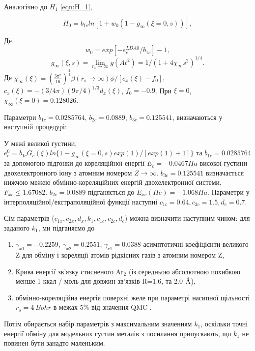 Аналогічно до $H_1$ \ref{eqn:H_1}, 

\begin{equation}
	H_0 = b_{1c}ln[1+w_0(1 - g_\infty(\xi = 0, s))], 
\end{equation} 

Де 
\begin{equation}
	w_0 = exp[-e_c^{LDA0}/b_{1c}]-1,
\end{equation}
\begin{equation}
	g_\infty(\xi,s) = \lim_{r_s \rightarrow \infty}g(At^2) = 1 / (1 + 4\chi_\infty s^2)^{1/4}.
\end{equation}
Де $\chi_\infty(\xi) = \left(\frac{3\pi^2}{16}\right)^{\frac{2}{3}}\beta(r_s \rightarrow \infty)\phi/[c_x(\xi)-f_0]$, $c_x(\xi) = -(3/4\pi)(9\pi/4)^{1/3}d_x(\xi)$, $f_0 = -0.9$. При $\xi = 0$, $ \chi_\infty(\xi = 0) = 0.128026$.

Параметри $b_{1c} = 0.0285764$, $b_{2c} = 0.0889$, $b_{3c} = 0.125541$, визначаються у наступній процедурі:

У межі великої густини, $e_c^0 = b_{1c}G_c(\xi)ln\{1 - g_\infty(\xi = 0, s)exp(1)/[exp(1)+1]\}$ та $b_{1c} = 0.0285764$ за допомогою підгонки до кореляційної енергії $E_c = -0.0467 Ha$ високої густини двохелектронного іону з атомним номером $Z \rightarrow \infty$. $b_{3c} = 0.125541$ визначається нижчою межею обмінно-кореляційних енергій двохелектронної системи, $F_{xc} \leq 1.67082$. $b_{2c} = 0.0889$ підганяється до $E_{xc}(He) = -1.068 Ha$. Параметри у інтерполяційної/екстраполяційної функції наступні $c_{1c} = 0.64, c_{2c} = 1.5, d_c = 0.7$.

Сім параметрів ($c_{1x}, c_{2x}, d_x, k_1, c_{1c}, c_{2c}, d_c$) можна визначити наступним чином: для заданого $k_1$, ми підганяємо до 
\begin{enumerate}
    \item $\gamma_{x1} = -0.2259$, $\gamma_{x2} = 0.2551$, $\gamma_{c1} = 0.0388$ асимптотичні коефіцієнти великого Z для обміну і кореляції атомів рідкісних газів з атомним номером Z,
    \item Крива енергії зв'язку стисненого Ar$_2$ (із середньою абсолютною похибкою менше 1 ккал / моль для довжин зв'язків R=1.6, та 2.0 $\text{\normalfont\AA}$),
    \item обмінно-кореляційна енергія поверхні желе при параметрі насипної щільності $r_s = 4 \ Bohr$ в межах 5\% від значення QMC \cite{PhysRevB.76}.
\end{enumerate}

Потім обирається набір параметрів з максимальним значенням $k_1$, оскільки точні енергії обміну для модельних густин металів з посилання \cite{PhysRevB.54} припускають, що $k_1$ не повинен бути занадто маленьким.

